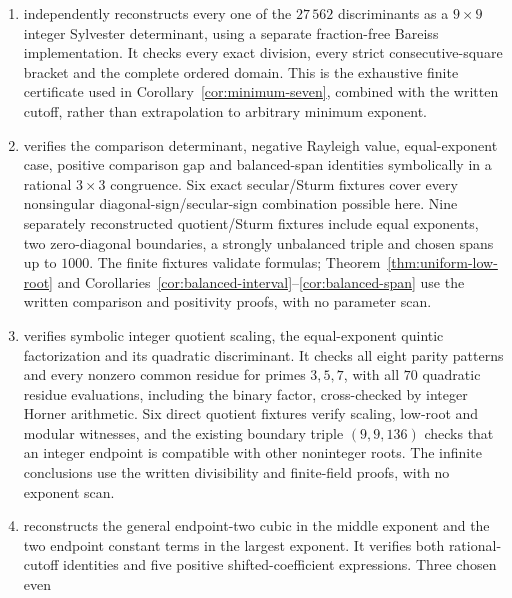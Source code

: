 \begin{enumerate}
representatives, including every first complement sign-pattern witness,
have separately reconstructed integer matrix characteristic polynomials,
complement endpoints and exact rational factorizations. The compatibility
entrypoint  runs the same corrected code.
\item {} independently
reconstructs every one of the $27\,562$ discriminants as a $9\times9$
integer Sylvester determinant, using a separate fraction-free Bareiss
implementation. It checks every exact division, every strict consecutive-square
bracket and the complete ordered domain. This is the exhaustive finite
certificate used in Corollary~\ref{cor:minimum-seven}, combined with the
written cutoff, rather than extrapolation to arbitrary minimum exponent.
\item {} verifies the comparison
determinant, negative Rayleigh value, equal-exponent case, positive
comparison gap and balanced-span identities symbolically in a rational
$3\times3$ congruence. Six exact secular/Sturm fixtures cover every
nonsingular diagonal-sign/secular-sign combination possible here.
Nine separately reconstructed quotient/Sturm fixtures include equal
exponents, two zero-diagonal boundaries, a strongly unbalanced triple
and chosen spans up to $1000$. The finite fixtures validate formulas;
Theorem~\ref{thm:uniform-low-root} and
Corollaries~\ref{cor:balanced-interval}--\ref{cor:balanced-span}
use the written comparison and positivity proofs, with no parameter scan.
\item {} verifies symbolic
integer quotient scaling, the equal-exponent quintic factorization and
its quadratic discriminant. It checks all eight parity patterns and
every nonzero common residue for primes $3,5,7$, with all $70$ quadratic
residue evaluations, including the binary factor, cross-checked by
integer Horner arithmetic. Six direct quotient fixtures verify scaling,
low-root and modular witnesses, and the existing boundary triple
$(9,9,136)$ checks that an integer endpoint is compatible with other
noninteger roots. The infinite conclusions use the written divisibility
and finite-field proofs, with no exponent scan.
\item {} reconstructs the general
endpoint-two cubic in the middle exponent and the two endpoint constant
terms in the largest exponent. It verifies both rational-cutoff identities
and five positive shifted-coefficient expressions. Three chosen even

\end{enumerate}
